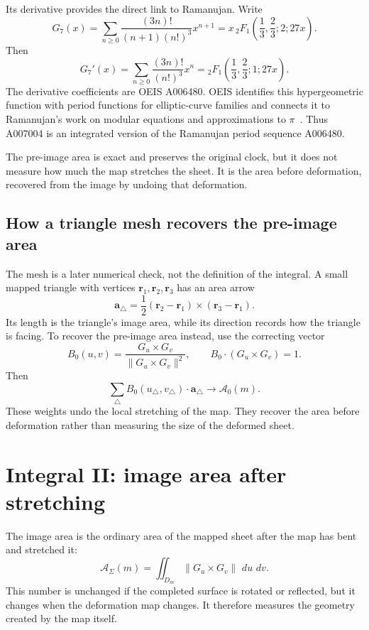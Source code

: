 \documentclass[11pt]{article}
\newcommand{\dd}{\,d}
\newcommand{\goldbox}[1]{\begin{center}\colorbox{softgold}{\parbox{0.93\linewidth}{#1}}\end{center}}
\begin{document}
Its derivative provides the direct link to Ramanujan. Write
\[
G_7(x)=\sum_{n\geq0}\frac{(3n)!}{(n+1)(n!)^3}x^{n+1}
=x\,{}_2F_1\!\left(\frac13,\frac23;2;27x\right).
\]
Then
\[
G_7'(x)=\sum_{n\geq0}\frac{(3n)!}{(n!)^3}x^n
={}_2F_1\!\left(\frac13,\frac23;1;27x\right).
\]
The derivative coefficients are OEIS A006480. OEIS identifies this
hypergeometric function with period functions for elliptic-curve families and
connects it to Ramanujan's work on modular equations and approximations to
$\pi$~\cite{oeis6480,ramanujan}. Thus A007004 is an integrated version of the
Ramanujan period sequence A006480.

\goldbox{The pre-image area is exact and preserves the original clock, but it
does not measure how much the map stretches the sheet. It is the area before
deformation, recovered from the image by undoing that deformation.}

\subsection*{How a triangle mesh recovers the pre-image area}

The mesh is a later numerical check, not the definition of the integral. A
small mapped triangle with vertices $\mathbf r_1,\mathbf r_2,\mathbf r_3$ has
an area arrow
\[
\mathbf a_\triangle=
\frac12(\mathbf r_2-\mathbf r_1)\times(\mathbf r_3-\mathbf r_1).
\]
Its length is the triangle's image area, while its direction records how the
triangle is facing. To recover the pre-image area instead, use the correcting
vector
\[
B_0(u,v)=
\frac{G_u\times G_v}{\|G_u\times G_v\|^2},
\qquad
B_0\cdot(G_u\times G_v)=1.
\]
Then
\[
\sum_{\triangle} B_0(u_\triangle,v_\triangle)\cdot
\mathbf a_\triangle
\longrightarrow \mathcal A_0(m).
\]
These weights undo the local stretching of the map. They recover the area
before deformation rather than measuring the size of the deformed sheet.

\section{Integral II: image area after stretching}

The image area is the ordinary area of the mapped sheet after the map has bent
and stretched it:
\[
\boxed{
\mathcal A_\Sigma(m)=
\iint_{D_m}\|G_u\times G_v\|\,\dd u\,\dd v.}
\]
This number is unchanged if the completed surface is rotated or reflected,
but it changes when the deformation map changes. It therefore measures the
geometry created by the map itself.
\end{document}
